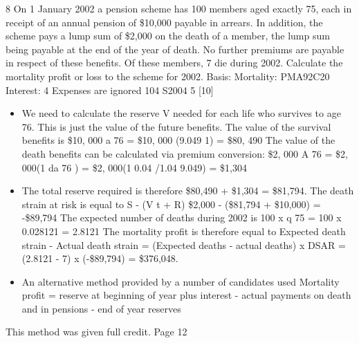 \documentclass[a4paper,12pt]{article}
\begin{document}
8
On 1 January 2002 a pension scheme has 100 members aged exactly 75, each in
receipt of an annual pension of \$10,000 payable in arrears. In addition, the scheme
pays a lump sum of \$2,000 on the death of a member, the lump sum being payable at
the end of the year of death. No further premiums are payable in respect of these
benefits.
Of these members, 7 die during 2002. Calculate the mortality profit or loss to the
scheme for 2002.
Basis: Mortality: PMA92C20
Interest: 4%
Expenses are ignored
104 S2004
5
[10]

\newpage
\begin{itemize}
\item We need to calculate the reserve V needed for each life who survives to age 76. This
is just the value of the future benefits.
The value of the survival benefits is
\$10, 000 a 76 = \$10, 000 (9.049 1)
= \$80, 490
The value of the death benefits can be calculated via premium conversion:
\$2, 000 A 76 = \$2, 000(1 da 76 )
= \$2, 000(1 0.04 /1.04 9.049)
= \$1,304
\item The total reserve required is therefore \$80,490 + \$1,304 = \$81,794.
The death strain at risk is equal to
S - (V t + R)
\$2,000 - (\$81,794 + \$10,000) = -\$89,794
The expected number of deaths during 2002 is 100 x q 75
= 100 x 0.028121 = 2.8121
The mortality profit is therefore equal to
Expected death strain - Actual death strain
= (Expected deaths - actual deaths) x DSAR
= (2.8121 - 7) x (-\$89,794)
= \$376,048.
\item An alternative method provided by a number of candidates used
Mortality profit =
reserve at beginning of year plus interest
- actual payments on death and in pensions
- end of year reserves
\end{itemize}
This method was given full credit.
Page 12 %
\end{document}
